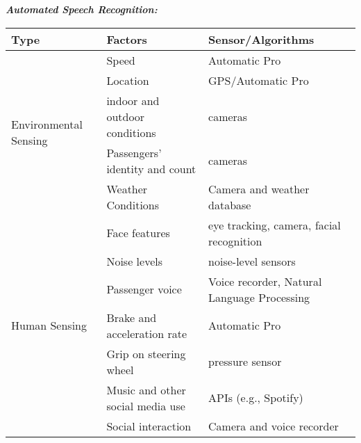 \noindent\textbf{\em Automated Speech Recognition:} \vskip 0.2in



\begin{center}
    \begin{tabular}{ | l | l | l |}
    \hline
    Type &  Factors & Sensor/Algorithms \\ \hline
    \multirow{5}{*}{Environmental Sensing} & Speed & Automatic Pro \\
        & Location & GPS/Automatic Pro \\
        & indoor and outdoor conditions & cameras \\
        & Passengers' identity and count & cameras \\
        & Weather Conditions & Camera and weather database\\\hline
    \multirow{8}{*}{Human Sensing} & Face features & eye tracking, camera, facial recognition \\
        & Noise levels & noise-level sensors \\
        & Passenger voice & Voice recorder, Natural Language Processing \\
        & Brake and acceleration rate & Automatic Pro \\
        & Grip on steering wheel & pressure sensor \\
        & Music and other social media use & APIs (e.g., Spotify) \\
        & Social interaction & Camera and voice recorder \\ \hline
    
    \end{tabular}
\end{center}













